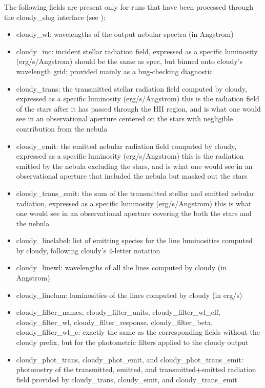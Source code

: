 \documentclass[letterpaper,10pt,english]{sphinxmanual}
\begin{document}
The following fields are present only for runs that have been processed through the cloudy\_slug interface (see {\hyperref[\detokenize{cloudy:sec-cloudy-slug}]{}}):
\begin{itemize}
\item {} 
cloudy\_wl: wavelengths of the output nebular spectra (in Angstrom)

\item {} 
cloudy\_inc: incident stellar radiation field, expressed as a specific luminosity (erg/s/Angstrom) \textendash{} should be the same as spec, but binned onto cloudy’s wavelength grid; provided mainly as a bug-checking diagnostic

\item {} 
cloudy\_trans: the transmitted stellar radiation field computed by cloudy, expressed as a specific luminosity (erg/s/Angstrom) \textendash{} this is the radiation field of the stars after it has passed through the HII region, and is what one would see in an observational aperture centered on the stars with negligible contribution from the nebula

\item {} 
cloudy\_emit: the emitted nebular radiation field computed by cloudy, expressed as a specific luminosity (erg/s/Angstrom) \textendash{} this is the radiation emitted by the nebula excluding the stars, and is what one would see in an observational aperture that included the nebula but masked out the stars

\item {} 
cloudy\_trans\_emit: the sum of the transmitted stellar and emitted nebular radiation, expressed as a specific luminosity (erg/s/Angstrom) \textendash{} this is what one would see in an observational aperture covering the both the stars and the nebula

\item {} 
cloudy\_linelabel: list of emitting species for the line luminosities computed by cloudy, following cloudy’s 4-letter notation

\item {} 
cloudy\_linewl: wavelengths of all the lines computed by cloudy (in Angstrom)

\item {} 
cloudy\_linelum: luminosities of the lines computed by cloudy (in erg/s)

\item {} 
cloudy\_filter\_names, cloudy\_filter\_units, cloudy\_filter\_wl\_eff, cloudy\_filter\_wl, cloudy\_filter\_response, cloudy\_filter\_beta, cloudy\_filter\_wl\_c: exactly the same as the corresponding fields without the cloudy prefix, but for the photometric filters applied to the cloudy output

\item {} 
cloudy\_phot\_trans, cloudy\_phot\_emit, and cloudy\_phot\_trans\_emit: photometry of the transmitted, emitted, and transmitted+emitted radiation field provided by cloudy\_trans, cloudy\_emit, and cloudy\_trans\_emit

\end{itemize}
\end{document}
